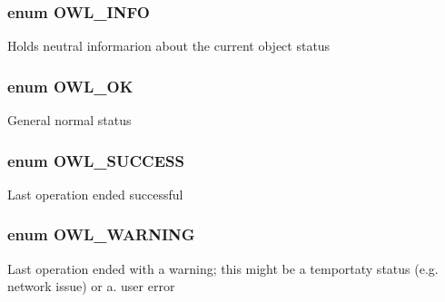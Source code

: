 \subsubsection[{OWL\_\-INFO}]{\setlength{\rightskip}{0pt plus 5cm}enum {\bf OWL\_\-INFO}}\label{owl_8severitycodes_8php_a139328861128689f2f4def6a399d9057}
Holds neutral informarion about the current object status 
\subsubsection[{OWL\_\-OK}]{\setlength{\rightskip}{0pt plus 5cm}enum {\bf OWL\_\-OK}}\label{owl_8severitycodes_8php_abc72c053cfd10025fe57797c41eab18e}
General normal status 
\subsubsection[{OWL\_\-SUCCESS}]{\setlength{\rightskip}{0pt plus 5cm}enum {\bf OWL\_\-SUCCESS}}\label{owl_8severitycodes_8php_a96223f06ba27bf5cbefa6e9d702897c2}
Last operation ended successful 
\subsubsection[{OWL\_\-WARNING}]{\setlength{\rightskip}{0pt plus 5cm}enum {\bf OWL\_\-WARNING}}\label{owl_8severitycodes_8php_ace886152e2e86cd2e91cb833fd495adb}
Last operation ended with a warning; this might be a temportaty status (e.g. network issue) or a. user error 
